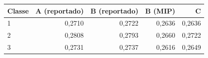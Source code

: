 \begin{tabular}{lrrrr}
\toprule
Classe & A (reportado) & B (reportado) & B (MIP) & C \\
\midrule
1 & 0,2710 & 0,2722 & 0,2636 & 0,2636 \\
2 & 0,2808 & 0,2793 & 0,2660 & 0,2722 \\
3 & 0,2731 & 0,2737 & 0,2616 & 0,2649 \\
\bottomrule
\end{tabular}
